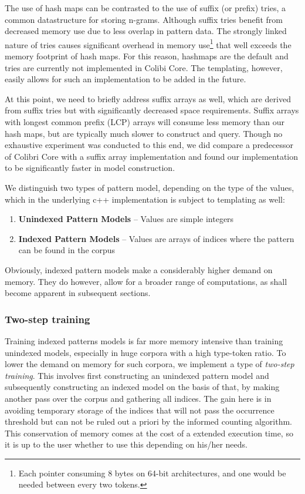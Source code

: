 \documentclass[a4paper,12pt]{article}
\begin{document}
The use of hash maps can be contrasted to the use of suffix (or prefix) tries,
a common datastructure for storing n-grams. Although suffix tries benefit from
decreased memory use due to less overlap in pattern data. The strongly linked
nature of tries causes significant overhead in memory use\footnote{Each pointer
consuming 8 bytes on 64-bit architectures, and one would be needed between
every two tokens.} that well exceeds the memory footprint of hash maps. For
this reason, hashmaps are the default and tries are currently not implemented
in Colibi Core. The templating, however, easily allows for such an
implementation to be added in the future.

At this point, we need to briefly address suffix arrays \cite{Manber90} as well, which
are derived from suffix tries but with significantly decreased space
requirements. Suffix arrays with longest common prefix (LCP) arrays will
consume less memory than our hash maps, but are typically much slower to
construct and query. Though no exhaustive experiment was conducted to this
end, we did compare a predecessor of Colibri Core with a suffix array implementation
\cite{Stehouwer10} and found our implementation to be significantly faster in model
construction.

We distinguish two types of pattern model, depending on the type of the values,
which in the underlying c++ implementation is subject to templating as well:

\begin{enumerate}
 \item \textbf{Unindexed Pattern Models} -- Values are simple integers
 \item \textbf{Indexed Pattern Models} -- Values are arrays of indices where the pattern can be found in the corpus
\end{enumerate}

Obviously, indexed pattern models make a considerably higher demand on memory.
They do however, allow for a broader range of computations, as shall become
apparent in subsequent sections.

\subsubsection{Two-step training}

Training indexed patterns models is far more memory intensive than training
unindexed models, especially in huge corpora with a high type-token ratio. To
lower the demand on memory for such corpora, we implement a type of
\emph{two-step training}. This involves first constructing an unindexed pattern
model and subsequently constructing an indexed model on the basis of that, by
making another pass over the corpus and gathering all indices. The gain here is
in avoiding temporary storage of the indices that will not pass the occurrence
threshold but can not be ruled out a priori by the informed counting algorithm.
This conservation of memory comes at the cost of a extended execution time, so
it is up to the user whether to use this depending on his/her needs.
\end{document}
